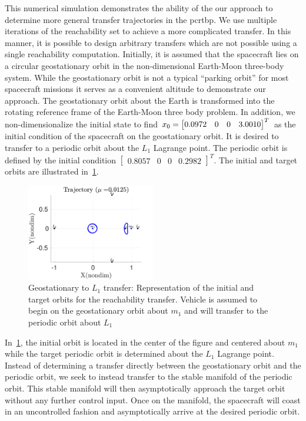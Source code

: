 This numerical simulation demonstrates the ability of the our approach to determine more general transfer trajectories in the \gls{pcrtbp}. 
We use multiple iterations of the reachability set to achieve a more complicated transfer.
In this manner, it is possible to design arbitrary transfers which are not possible using a single reachability computation.
Initially, it is assumed that the spacecraft lies on a circular geostationary orbit in the non-dimensional Earth-Moon three-body system. 
While the geostationary orbit is not a typical ``parking orbit'' for most spacecraft missions it serves as a convenient altitude to demonstrate our approach.
The geostationary orbit about the Earth is transformed into the rotating reference frame of the Earth-Moon three body problem.
In addition, we non-dimensionalize the initial state to find \( x_0 = \begin{bmatrix} 0.0972 & 0 & 0 & 3.0010\end{bmatrix}^T\) as the initial condition of the spacecraft on the geostationary orbit.
It is desired to transfer to a periodic orbit about the \( L_1 \) Lagrange point. 
The periodic orbit is defined by the initial condition \(\begin{bmatrix} 0.8057 & 0 & 0 & 0.2982 \end{bmatrix}^T \).
The initial and target orbits are illustrated in~\cref{fig:geo_transfer_target}.
\begin{figure}[htbp]
   \centering
   \includegraphics[width=0.5\textwidth]{figures/2017_JAS/initial_final} %
   \caption{Geostationary to \( L_1 \) transfer: Representation of the initial and target orbits for the reachability transfer. 
   Vehicle is assumed to begin on the geostationary orbit about \( m_1\) and will transfer to the periodic orbit about \( L_1\)}
   \label{fig:geo_transfer_target}
\end{figure}
In~\cref{fig:geo_transfer_target}, the initial orbit is located in the center of the figure and centered about \( m_1 \) while the target periodic orbit is determined about the \( L_1 \) Lagrange point.
Instead of determining a transfer directly between the geostationary orbit and the periodic orbit, we seek to instead transfer to the stable manifold of the periodic orbit.
This stable manifold will then asymptotically approach the target orbit without any further control input.
Once on the manifold, the spacecraft will coast in an uncontrolled fashion and asymptotically arrive at the desired periodic orbit.


